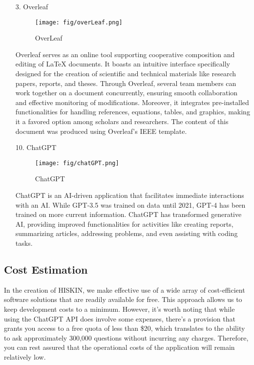\documentclass[conference]{IEEEtran}
\begin{document}
\begin{enumerate}
    \item[3.]Overleaf
    \begin{figure}[h]
    \centering
    \texttt{[image: fig/overLeaf.png]}
    \label{fig:OverLeaf}
    \caption{OverLeaf} 
    \end{figure}
    \item[]Overleaf serves as an online tool supporting cooperative composition and editing of LaTeX documents. It boasts an intuitive interface specifically designed for the creation of scientific and technical materials like research papers, reports, and theses. Through Overleaf, several team members can work together on a document concurrently, ensuring smooth collaboration and effective monitoring of modifications. Moreover, it integrates pre-installed functionalities for handling references, equations, tables, and graphics, making it a favored option among scholars and researchers. The content of this document was produced using Overleaf's IEEE template.\\

    \item[10.]ChatGPT
    \begin{figure}[h]
    \centering
    \texttt{[image: fig/chatGPT.png]}
    \label{fig:ChatGPT}
    \caption{ChatGPT} 
    \end{figure}
    \item[]ChatGPT is an AI-driven application that facilitates immediate interactions with an AI. While GPT-3.5 was trained on data until 2021, GPT-4 has been trained on more current information. ChatGPT has transformed generative AI, providing improved functionalities for activities like creating reports, summarizing articles, addressing problems, and even assisting with coding tasks.\\ 
\end{enumerate}

\subsection{Cost Estimation}
In the creation of HISKIN, we make effective use of a wide array of cost-efficient software solutions that are readily available for free. This approach allows us to keep development costs to a minimum. However, it's worth noting that while using the ChatGPT API does involve some expenses, there's a provision that grants you access to a free quota of less than \$20, which translates to the ability to ask approximately 300,000 questions without incurring any charges. Therefore, you can rest assured that the operational costs of the application will remain relatively low.\\ \\ \\ \\ \\ \\
\end{document}
